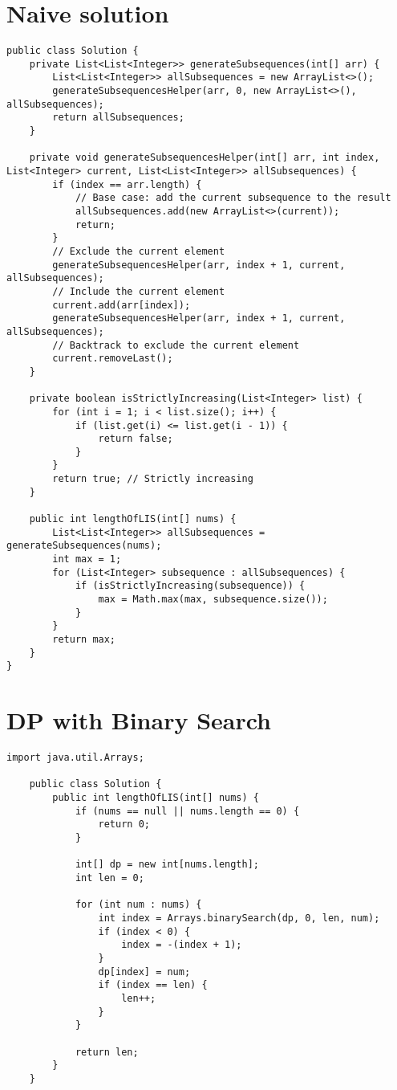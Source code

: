 \documentclass{article}
\begin{document}
    \section{Naive solution}
    \begin{lstlisting}[caption=$\mathcal{O}(2^{n})$ Backtracking Algorithm]
public class Solution {
	private List<List<Integer>> generateSubsequences(int[] arr) {
		List<List<Integer>> allSubsequences = new ArrayList<>();
		generateSubsequencesHelper(arr, 0, new ArrayList<>(), allSubsequences);
		return allSubsequences;
	}
	
	private void generateSubsequencesHelper(int[] arr, int index, List<Integer> current, List<List<Integer>> allSubsequences) {
		if (index == arr.length) {
			// Base case: add the current subsequence to the result
			allSubsequences.add(new ArrayList<>(current));
			return;
		}		
		// Exclude the current element
		generateSubsequencesHelper(arr, index + 1, current, allSubsequences);		
		// Include the current element
		current.add(arr[index]);
		generateSubsequencesHelper(arr, index + 1, current, allSubsequences);		
		// Backtrack to exclude the current element
		current.removeLast();
	}
	
	private boolean isStrictlyIncreasing(List<Integer> list) {
		for (int i = 1; i < list.size(); i++) {
			if (list.get(i) <= list.get(i - 1)) {
				return false;
			}
		}
		return true; // Strictly increasing
	}
	
    public int lengthOfLIS(int[] nums) {
    	List<List<Integer>> allSubsequences = generateSubsequences(nums);
    	int max = 1;
    	for (List<Integer> subsequence : allSubsequences) {
    		if (isStrictlyIncreasing(subsequence)) {
    			max = Math.max(max, subsequence.size());
    		}
    	}
    	return max;
    }
}
    \end{lstlisting}

    \section{DP with Binary Search}
    \begin{lstlisting}[caption=$\mathcal{O}(n\log_{}{n})$ DP with Binary Search]
	import java.util.Arrays;

	public class Solution {
		public int lengthOfLIS(int[] nums) {
			if (nums == null || nums.length == 0) {
				return 0;
			}

			int[] dp = new int[nums.length];
			int len = 0;

			for (int num : nums) {
				int index = Arrays.binarySearch(dp, 0, len, num);
				if (index < 0) {
					index = -(index + 1);
				}
				dp[index] = num;
				if (index == len) {
					len++;
				}
			}

			return len;
		}
	}
    \end{lstlisting}
\end{document}
